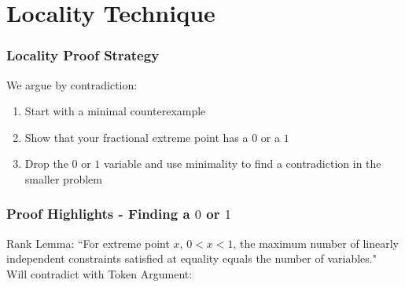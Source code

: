 \documentclass[10pt]{beamer}
\begin{document}
\section{Locality Technique}
\begin{frame}
\frametitle{Locality Proof Strategy}
We argue by contradiction:
\begin{enumerate}
\item Start with a minimal counterexample
\item \alert<2>{Show that your fractional extreme point has a $0$ or a $1$}
\item Drop the $0$ or $1$ variable and use minimality to find a contradiction in the smaller problem
\end{enumerate}
\end{frame}

\begin{frame}
\frametitle{Proof Highlights - Finding a $0$ or $1$}
\alert{Rank Lemma:} ``For extreme point $x$, $0 < x < 1$, the maximum number of linearly independent constraints satisfied at equality equals the number of variables."\\
Will contradict with \alert{Token Argument:}
\begin{figure}
\centering
{}
\end{figure}
\end{frame}
\end{document}
